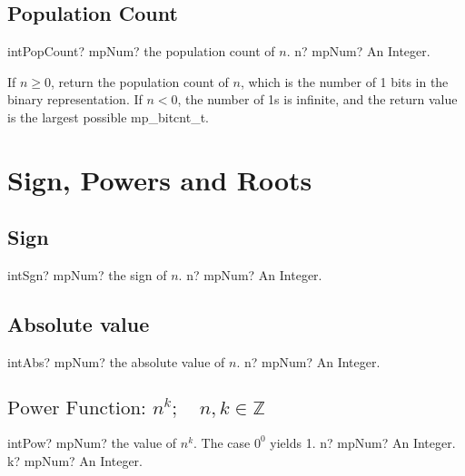 \subsection{Population Count}

\begin{mpFunctionsExtract}
	\mpFunctionOne
	{intPopCount? mpNum? the population count of $n$.}
	{n? mpNum? An Integer.}
\end{mpFunctionsExtract}

\vspace{0.3cm}
If $n \geq 0$, return the population count of $n$, which is the number of 1 bits in the binary
representation. If $n < 0$, the number of 1s is infinite, and the return value is the largest
possible mp\_bitcnt\_t.






\section{Sign, Powers and Roots}
\label{PowersAndRootsInt}


\subsection{Sign}

\begin{mpFunctionsExtract}
	\mpFunctionOne
	{intSgn? mpNum? the sign of $n$.}
	{n? mpNum? An Integer.}
\end{mpFunctionsExtract}





\subsection{Absolute value}

\begin{mpFunctionsExtract}
	\mpFunctionOne
	{intAbs? mpNum? the absolute value of $n$.}
	{n? mpNum? An Integer.}
\end{mpFunctionsExtract}





\subsection{\texorpdfstring{$\text{Power Function: }n^k; \quad n, k \in  \mathbb{Z}$}{powerxk}}

\begin{mpFunctionsExtract}
	\mpFunctionTwo
	{intPow? mpNum? the value of $n^k$. The case $0^0$ yields 1.}
	{n? mpNum? An Integer.}
	{k? mpNum? An Integer.}
\end{mpFunctionsExtract}





